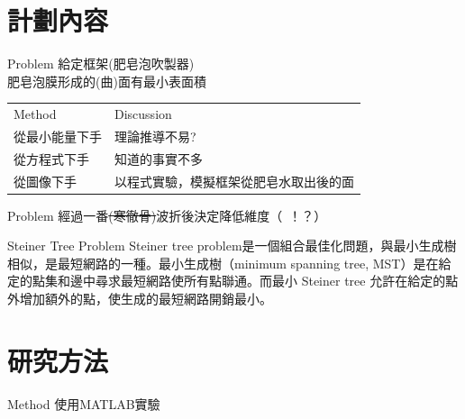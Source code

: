 \documentclass[11pt]{beamer}
\begin{document}
\section{計劃內容}
\begin{frame}{Problem}
給定框架(肥皂泡吹製器)\\肥皂泡膜形成的(曲)面有最小表面積\\[0.5cm]
\begin{tabular}{ll}
Method & Discussion\\
\pause 從最小能量下手 & \pause 理論推導不易?\\

\pause 從方程式下手&  \pause 知道的事實不多\\

\pause 從圖像下手 &   \pause 以程式實驗，模擬框架從肥皂水取出後的面

\end{tabular}

\end{frame}
\begin{frame}{Problem}
經過一番\sout{(寒徹骨)}波折後決定降低維度（\ ！？）\\[0.5cm]
\pause
{}
\end{frame}
\begin{frame}{Steiner Tree Problem}
Steiner tree problem是一個組合最佳化問題，與最小生成樹相似，是最短網路的一種。最小生成樹（minimum spanning tree, MST）是在給定的點集和邊中尋求最短網路使所有點聯通。而最小 Steiner tree 允許在給定的點外增加額外的點，使生成的最短網路開銷最小。\end{frame}
\section{研究方法}
\begin{frame}{Method}
使用MATLAB實驗
\end{frame}
\end{document}
